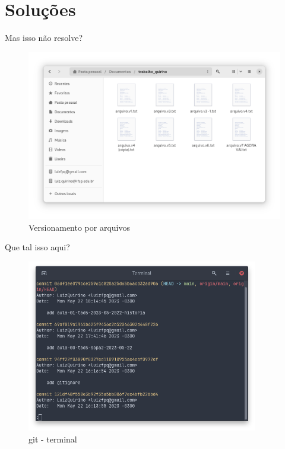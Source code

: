 \documentclass{beamer}
\begin{document}
\section{Soluções}
\begin{frame}[fragile]{Mas isso não resolve?}
      \begin{figure}[H]
            \centerline{\includegraphics[width=1.0\textwidth]{assets/aula-tdsi-ifds-2023-05-24/Captura de tela de 2023-05-23 11-29-31.png}}
            \caption{Versionamento por arquivos}
        \end{figure}
\end{frame}

\begin{frame}[fragile]{Que tal isso aqui?}
      \begin{figure}[H]
            \centerline{\includegraphics[width=0.9\textwidth]{assets/aula-tdsi-ifds-2023-05-24/Captura de tela de 2023-05-23 11-32-10.png}}
            \caption{git - terminal}
        \end{figure}
\end{frame}
\end{document}
